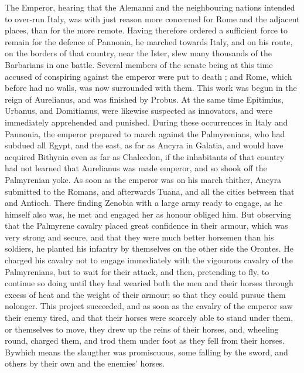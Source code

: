 The Emperor, hearing that the Alemanni and the neighbouring nations intended to over-run Italy, was with just reason more concerned for Rome and the adjacent places, than for the more remote. Having therefore ordered a sufficient force to remain for the defence of Pannonia, he marched towards Italy, and on his route, on the borders of that country, near the Ister, slew many thousands of the Barbarians in one battle. Several members of the senate being at this time accused of conspiring against the emperor were put to death ; and Rome, which before had no walls, was now surrounded with them. This work was begun in the reign of Aurelianus, and was finished by Probus. At the same time Epitimius, Urbanus, and Domitianus, were likewise suspected as innovators, and were immediately apprehended and punished. During these occurrences in Italy and Pannonia, the emperor prepared to march against the Palmyrenians, who had subdued all Egypt, and the east, as far as Ancyra in Galatia, and would have acquired Bithynia even as far as Chalcedon, if the inhabitants of that country had not learned that Aurelianus was made emperor, and so shook off the Palmyrenian yoke. As soon as the emperor was on his march thither, Ancyra submitted to the Romans, and afterwards Tuana,
and all the cities between that and Antioch. There finding Zenobia with a large army ready to engage, as he himself also was, he met and engaged her as honour obliged him. But observing that the Palmyrene cavalry placed great confidence in their armour, which was very strong and secure, and that they were much better horsemen than his soldiers, he planted his infantry by themselves on the other side the Orontes. He charged his cavalry not to engage immediately with the vigourous cavalry of the Palmyrenians, but to wait for their attack, and then, pretending to fly, to continue so doing until they had wearied both the men and their horses through excess of heat and the weight of their armour; so that they could pursue them nolonger. This project succeeded, and as soon as the cavalry of the emperor saw their enemy tired, and that their horses were scarcely able to stand under them, or themselves to move, they drew up the reins of their horses, and, wheeling round, charged them, and trod them under foot as they fell from their horses. By\emph{}which means the slaugther was promiscuous, some falling by the sword, and others by their own and the enemies' horses.

